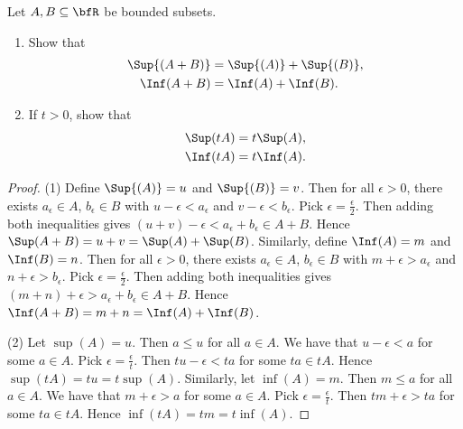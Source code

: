 \documentclass[10pt,twoside,openany]{memoir}
\begin{document}
    \begin{exercise}
        Let $A,B \subseteq \bfR$ be bounded subsets.
            \begin{enumerate}[label = (\arabic*)]
                \item Show that
                    \begin{equation*}
                    \begin{split}
                        \Sup{(A+B)} &= \Sup{(A)} + \Sup{(B)}, \\
                        \Inf(A+B) &= \Inf(A) + \Inf(B).
                    \end{split}
                    \end{equation*}
                \item If $t>0$, show that 
                    \begin{equation*}
                    \begin{split}
                        \Sup(tA) &= t \Sup(A), \\
                        \Inf(tA) &= t \Inf(A).
                    \end{split}
                    \end{equation*}
            \end{enumerate}
                \begin{proof}
                    (1) Define $\Sup{(A)} = u$ and $\Sup{(B)} = v$. Then for all $\epsilon > 0$, there exists $a_\epsilon \in A$, $b_\epsilon \in B$ with $u - \epsilon < a_\epsilon$ and $v - \epsilon < b_\epsilon$. Pick $\epsilon = \frac{\epsilon}{2}$. Then adding both inequalities gives $(u + v) - \epsilon < a_\epsilon + b_\epsilon \in A+B$. Hence $\Sup(A+B) = u + v = \Sup(A) + \Sup(B)$. Similarly, define $\Inf(A) = m$ and $\Inf(B) = n$. Then for all $\epsilon > 0$, there exists $a_\epsilon \in A$, $b_\epsilon \in B$ with $m + \epsilon > a_\epsilon$ and $n + \epsilon > b_\epsilon$. Pick $\epsilon = \frac{\epsilon}{2}$. Then adding both inequalities gives $(m+n)+\epsilon > a_\epsilon + b_\epsilon \in A+B$. Hence $\Inf(A+B) = m + n = \Inf(A) + \Inf(B)$.

                    (2) Let $\sup(A) = u$. Then $a \leq u $ for all $a \in A$. We have that $u - \epsilon < a$ for some $a \in A$. Pick $\epsilon = \frac{\epsilon}{t}$. Then $t u - \epsilon < ta$ for some $t a \in tA$. Hence $\sup(tA) = tu = t\sup(A)$. Similarly, let $\inf(A) = m$. Then $m \leq a$ for all $a \in A$. We have that $m+\epsilon > a$ for some $a \in A$. Pick $\epsilon = \frac{\epsilon}{t}$. Then $tm + \epsilon > ta$ for some $ta \in tA$. Hence $\inf(tA) = tm = t\inf(A)$.
                \end{proof}
    \end{exercise}
\end{document}
